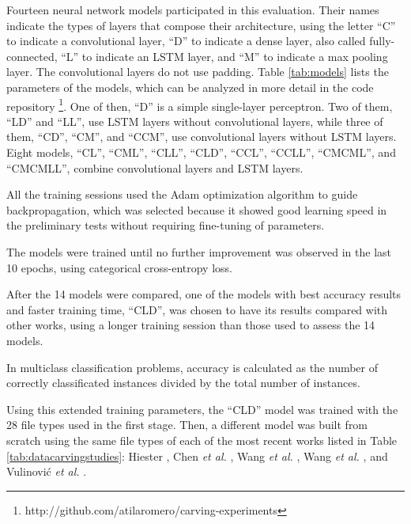 Fourteen neural network models participated in this evaluation.
Their names indicate the types of layers that compose their architecture, using the letter ``C'' to indicate a convolutional layer, ``D'' to indicate a dense layer, also called fully-connected, ``L'' to indicate an LSTM layer, and ``M'' to indicate a max pooling layer. The convolutional layers do not use padding.
Table \ref{tab:models} lists the parameters of the models, which can be analyzed in more detail in the code repository \footnote{http://github.com/atilaromero/carving-experiments}. One of then, ``D'' is a simple single-layer perceptron. Two of them, ``LD'' and ``LL'', use LSTM layers without convolutional layers, while three of them, ``CD'', ``CM'', and ``CCM'', use convolutional layers without LSTM layers. Eight models, ``CL'', ``CML'', ``CLL'', ``CLD'', ``CCL'', ``CCLL'', ``CMCML'', and ``CMCMLL'', combine convolutional layers and LSTM layers. 



All the training sessions used the Adam \cite{kingma_adam:_2014}
optimization algorithm to guide backpropagation, which was selected because it showed good learning speed in the preliminary tests without requiring fine-tuning of parameters.

The models were trained until no further improvement was observed in the last 10 epochs, using categorical cross-entropy loss.


After the 14 models were compared, one of the models with best accuracy results and faster training time, ``CLD'', was chosen to have its results compared with other works, using a longer training session than those used to assess the 14 models.

In multiclass classification problems, accuracy is calculated as the number of correctly classificated instances divided by the total number of instances.

Using this extended training parameters, the ``CLD'' model was trained with the 28 file types used in the first stage. Then, a different model was built from scratch using the same file types of each of the most recent works listed in Table \ref{tab:datacarvingstudies}: 
Hiester \cite{hiester_file_2018}, 
Chen \textit{et al.} \cite{chen_file_2018},
Wang \textit{et al.} \cite{wang_sparse_2018},
Wang \textit{et al.} \cite{wang_file_2018},
and
Vulinović \textit{et al.} \cite{vulinovic_neural_2019}.

